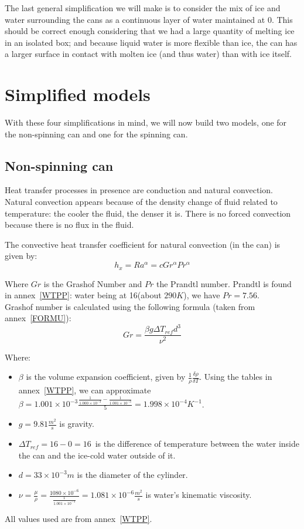 \documentclass{report}
\begin{document}
	The last general simplification we will make is to consider the mix of ice and water surrounding the cans as a continuous layer of water maintained at 0\textcelsius. This should be correct enough considering that we had a large quantity of melting ice in an isolated box; and because liquid water is more flexible than ice, the can has a larger surface in contact with molten ice (and thus water) than with ice itself.
	
	
	\section{Simplified models}\label{sm}
	
	With these four simplifications in mind, we will now build two models, one for the non-spinning can and one for the spinning can.
	
	\subsection{Non-spinning can}\label{nrc}
	
	Heat transfer processes in presence are conduction and natural convection. Natural convection appears because of the density change of fluid related to temperature: the cooler the fluid, the denser it is. There is no forced convection because there is no flux in the fluid.
	
	The convective heat transfer coefficient for natural convection (in the can) is given by:
	\begin{equation}
		h_x=Ra^\alpha = cGr^\alpha Pr^\alpha
	\end{equation}
	
	Where $Gr$ is the Grashof Number and $Pr$ the Prandtl number. Prandtl is found in annex~\ref{WTPP}: water being at 16\textcelsius (about $290K$), we have $Pr=7.56$.\\
	Grashof number is calculated using the following formula (taken from annex~\ref{FORMU}):
	\begin{equation}
	Gr=\frac{\beta g \Delta T_{ref} d^3}{\nu^2}
	\end{equation}
	
	Where:
	\begin{itemize}
		\item $\beta$ is the volume expansion coefficient, given by $\frac{1}{\rho}\frac{\delta\rho}{\delta T}$. Using the tables in annex~\ref{WTPP}, we can approximate $\beta=1.001\times 10^{-3}\frac{\frac{1}{1.000\times 10^{-3}}-\frac{1}{1.001\times 10^{-3}}}{5}=1.998\times 10^{-4} K^{-1}$.
		\item $g=9.81\frac{m^2}{s}$ is gravity.
		\item $\Delta T_{ref}=16-0=16$\textcelsius\ is the difference of temperature between the water inside the can and the ice-cold water outside of it.
		\item $d=33\times 10^{-3}m$ is the diameter of the cylinder.
		\item $\nu=\frac{\mu}{\rho}=\frac{1080\times 10^{-6}}{\frac{1}{1.001\times 10^{-3}}}=1.081\times 10^{-6}\frac{m^2}{s}$ is water's kinematic viscosity.
	\end{itemize}
	All values used are from annex~\ref{WTPP}.
	
\end{document}

